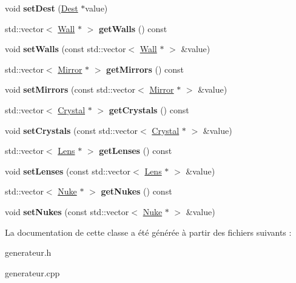 \begin{DoxyCompactItemize}
\item 
\mbox{\label{classgenerateur_a9efc572b325286846a3472e16aa5c721}} 
void {\bfseries set\+Dest} (\mbox{\hyperlink{class_dest}{Dest}} $\ast$value)
\item 
\mbox{\label{classgenerateur_af517d3e9d955084f3cf0d3f7144776a0}} 
std\+::vector$<$ \mbox{\hyperlink{class_wall}{Wall}} $\ast$ $>$ {\bfseries get\+Walls} () const
\item 
\mbox{\label{classgenerateur_a9b9fc738f0dede33140397561b795a1b}} 
void {\bfseries set\+Walls} (const std\+::vector$<$ \mbox{\hyperlink{class_wall}{Wall}} $\ast$ $>$ \&value)
\item 
\mbox{\label{classgenerateur_a653a7c93aae12f26f2cff2e25bed1640}} 
std\+::vector$<$ \mbox{\hyperlink{class_mirror}{Mirror}} $\ast$ $>$ {\bfseries get\+Mirrors} () const
\item 
\mbox{\label{classgenerateur_afc3ce4f544ca32baee66684beb6b1cb1}} 
void {\bfseries set\+Mirrors} (const std\+::vector$<$ \mbox{\hyperlink{class_mirror}{Mirror}} $\ast$ $>$ \&value)
\item 
\mbox{\label{classgenerateur_a0207ffbb29dc66e65dcaa4d46fa0c074}} 
std\+::vector$<$ \mbox{\hyperlink{class_crystal}{Crystal}} $\ast$ $>$ {\bfseries get\+Crystals} () const
\item 
\mbox{\label{classgenerateur_a79d10e45dbd3140f680faa905dd7063b}} 
void {\bfseries set\+Crystals} (const std\+::vector$<$ \mbox{\hyperlink{class_crystal}{Crystal}} $\ast$ $>$ \&value)
\item 
\mbox{\label{classgenerateur_a326e19b44e10ffc23434a2b7a34ffeca}} 
std\+::vector$<$ \mbox{\hyperlink{class_lens}{Lens}} $\ast$ $>$ {\bfseries get\+Lenses} () const
\item 
\mbox{\label{classgenerateur_a4f679196ecc3e8626d45c8fcf66dcf84}} 
void {\bfseries set\+Lenses} (const std\+::vector$<$ \mbox{\hyperlink{class_lens}{Lens}} $\ast$ $>$ \&value)
\item 
\mbox{\label{classgenerateur_a80ad5c4ade4b3cebd449cedda6c68126}} 
std\+::vector$<$ \mbox{\hyperlink{class_nuke}{Nuke}} $\ast$ $>$ {\bfseries get\+Nukes} () const
\item 
\mbox{\label{classgenerateur_a61c5dc979e8bc08361c3fedaa3319ba8}} 
void {\bfseries set\+Nukes} (const std\+::vector$<$ \mbox{\hyperlink{class_nuke}{Nuke}} $\ast$ $>$ \&value)
\end{DoxyCompactItemize}


La documentation de cette classe a été générée à partir des fichiers suivants \+:\begin{DoxyCompactItemize}
\item 
generateur.\+h\item 
generateur.\+cpp\end{DoxyCompactItemize}

